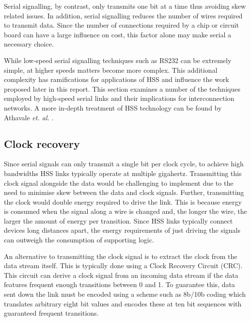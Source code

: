 		Serial signalling, by contrast, only transmits one bit at a time thus
		avoiding skew related issues. In addition, serial signalling reduces the
		number of wires required to transmit data. Since the number of
		connections required by a chip or circuit board can have a large influence
		on cost, this factor alone may make serial a necessary choice.
		
		While low-speed serial signalling techniques such as RS232 can be extremely
		simple, at higher speeds matters become more complex. This additional
		complexity has ramifications for applications of HSS and influence the work
		proposed later in this report. This section examines a number of the
		techniques employed by high-speed serial links and their implications for
		interconnection networks. A more in-depth treatment of HSS technology can be
		found by Athavale \emph{et. al.} \cite{athavale05}.
		
		\subsection{Clock recovery}
			
			
			Since serial signals can only transmit a single bit per clock cycle, to
			achieve high bandwidths HSS links typically operate at multiple gigahertz.
			Transmitting this clock signal alongside the data would be challenging to
			implement due to the need to minimise skew between the data and clock
			signals. Further, transmitting the clock would double energy required to
			drive the link. This is because energy is consumed when the signal along a
			wire is changed and, the longer the wire, the larger the amount of energy
			per transition. Since HSS links typically connect devices long distances
			apart, the energy requirements of just driving the signals can outweigh
			the consumption of supporting logic.
			
			An alternative to transmitting the clock signal is to extract the clock
			from the data stream itself. This is typically done using a Clock Recovery
			Circuit (CRC). This circuit can derive a clock signal from an incoming
			data stream if the data features frequent enough transitions between 0 and
			1. To guarantee this, data sent down the link must be encoded using a
			scheme such as 8b/10b coding \cite{widmer83} which translates arbitrary
			eight bit values and encodes these at ten bit sequences with guaranteed
			frequent transitions.
			
